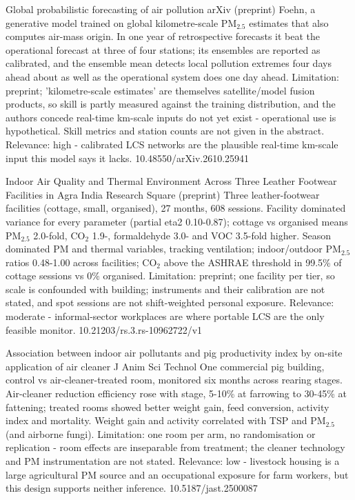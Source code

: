\documentclass[10pt]{article}
\begin{document}
{Global probabilistic forecasting of air pollution}
{arXiv (preprint)}
{Foehn, a generative model trained on global kilometre-scale PM$_{2.5}$ estimates that also computes air-mass origin. In one year of retrospective forecasts it beat the operational forecast at three of four stations; its ensembles are reported as calibrated, and the ensemble mean detects local pollution extremes four days ahead about as well as the operational system does one day ahead. Limitation: preprint; 'kilometre-scale estimates' are themselves satellite/model fusion products, so skill is partly measured against the training distribution, and the authors concede real-time km-scale inputs do not yet exist - operational use is hypothetical. Skill metrics and station counts are not given in the abstract. Relevance: high - calibrated LCS networks are the plausible real-time km-scale input this model says it lacks.}
{10.48550/arXiv.2610.25941}

\par{}\baselineskip{}\baselineskip
{}

{Indoor Air Quality and Thermal Environment Across Three Leather Footwear Facilities in Agra India}
{Research Square (preprint)}
{Three leather-footwear facilities (cottage, small, organised), 27 months, 608 sessions. Facility dominated variance for every parameter (partial eta2 0.10-0.87); cottage vs organised means PM$_{2.5}$ 2.0-fold, CO$_2$ 1.9-, formaldehyde 3.0- and VOC 3.5-fold higher. Season dominated PM and thermal variables, tracking ventilation; indoor/outdoor PM$_{2.5}$ ratios 0.48-1.00 across facilities; CO$_2$ above the ASHRAE threshold in 99.5\% of cottage sessions vs 0\% organised. Limitation: preprint; one facility per tier, so scale is confounded with building; instruments and their calibration are not stated, and spot sessions are not shift-weighted personal exposure. Relevance: moderate - informal-sector workplaces are where portable LCS are the only feasible monitor.}
{10.21203/rs.3.rs-10962722/v1}

{Association between indoor air pollutants and pig productivity index by on-site application of air cleaner}
{J Anim Sci Technol}
{One commercial pig building, control vs air-cleaner-treated room, monitored six months across rearing stages. Air-cleaner reduction efficiency rose with stage, 5-10\% at farrowing to 30-45\% at fattening; treated rooms showed better weight gain, feed conversion, activity index and mortality. Weight gain and activity correlated with TSP and PM$_{2.5}$ (and airborne fungi). Limitation: one room per arm, no randomisation or replication - room effects are inseparable from treatment; the cleaner technology and PM instrumentation are not stated. Relevance: low - livestock housing is a large agricultural PM source and an occupational exposure for farm workers, but this design supports neither inference.}
{10.5187/jast.2500087}
\end{document}
